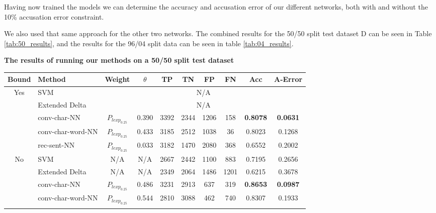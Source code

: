 Having now trained the models we can determine the accuracy and accusation error
of our different networks, both with and without the 10\% accusation error
constraint.

We also used that same approach for the other two networks. The combined
results for the 50/50 split test dataset \gls{D} can be seen in Table
\ref{tab:50_results}, and the results for the 96/04 split data can be seen in
table \ref{tab:04_results}.

\begin{table}[]
\centering
\textbf{The results of running our methods on a 50/50 split test dataset}\par\medskip
\begin{tabular}{|c|l|c|c|c|c|c|c|c|c|}
\hline
Bound                & Method                  & Weight            & $\theta$ & TP  & TN  & FP  & FN  & Acc             & A-Error         \\ \hline
\multirow{5}{*}{Yes} & SVM                     & \multicolumn{8}{c|}{N/A}                                                                     \\ \cline{2-10} 
                     & Extended Delta          & \multicolumn{8}{c|}{N/A}                                                                     \\ \cline{2-10} 
                     & \gls{conv-char-NN}      & $P_{lexp_{0.25}}$ & 0.390    & 3392 & 2344 & 1206 & 158  & \textbf{0.8078} & \textbf{0.0631} \\ \cline{2-10} 
                     & \gls{conv-char-word-NN} & $P_{lexp_{0.25}}$ & 0.433    & 3185 & 2512 & 1038 & 36   & 0.8023          & 0.1268          \\ \cline{2-10} 
                     & \gls{rec-sent-NN}       & $P_{lexp_{0.25}}$ & 0.033    & 3182 & 1470 & 2080 & 368  & 0.6552          & 0.2002          \\ \hline\hline
\multirow{5}{*}{No}  & SVM                     & N/A               & N/A      & 2667 & 2442 & 1100 & 883  & 0.7195          & 0.2656          \\ \cline{2-10} 
                     & Extended Delta          & N/A               & N/A      & 2349 & 2064 & 1486 & 1201 & 0.6215          & 0.3678          \\ \cline{2-10} 
                     & \gls{conv-char-NN}      & $P_{lexp_{0.25}}$ & 0.486    & 3231 & 2913 & 637  & 319  & \textbf{0.8653} & \textbf{0.0987} \\ \cline{2-10} 
                     & \gls{conv-char-word-NN} & $P_{lexp_{0.25}}$ & 0.544    & 2810 & 3088 & 462  & 740  & 0.8307          & 0.1933          \\ \cline{2-10} 

\end{tabular}
\end{table}
